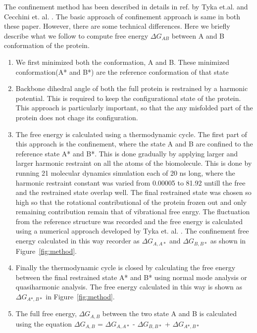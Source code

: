 \documentclass[12pt]{article}
\begin{document}
The confinement method has been described in details in ref. by Tyka et.al. \cite{Tyka2006} and 
Cecchini et. al. \cite{Cecchini2009}. The basic approach of confinement approach is same in both
these paper. However, there are some technical differences. Here we briefly describe what we follow
to compute free energy $\Delta G_{AB}$ between A and B
conformation of the protein.

\begin{enumerate}

\item  We first minimized both the conformation, A and B. These minimized conformation(A* and B*) 
       are the reference conformation of that state

\item Backbone dihedral angle of both the full protein is restrained by a harmonic potential. This is required to keep
    the configurational state of the protein. This approach is particularly important, so that the any misfolded part 
    of the protein does not chage its configuration. 

\item  The free energy is calculated using a thermodynamic cycle. The first part of this approach is the confinement, where
       the state A and B are confined to the reference state A* and B*. This is done gradually by applying larger and larger
       harmonic restraint on all the atoms of the biomolecule. This is done by running 21 molecular dynamics simulation 
       each of 20 ns long, where the harmonic restraint constant was varied from 0.00005 to 81.92 untill the free and the 
       restrained state overlap well. The final restrained state was chosen so high so that the rotational contributional 
       of the protein frozen out and only remaining contribution remain that of vibrational free enrgy. The fluctuation from
       the reference structure was recorded and the free energy is calculated using a numerical
       approach developed by Tyka et. al. \cite{Tyka2006}. The confinement free energy calculated in this way recorder as 
       $\Delta G_{A,A*}$ and $\Delta G_{B,B*}$ as shown in Figure~\ref{fig:method}.     

\item  Finally the thermodynamic cycle is closed by calculating the free energy between the final
       restrained state A* and B* using normal mode analysis or quasiharmonic analysis. The free energy calculated in 
       this way is shown as $\Delta G_{A*,B*}$ in Figure~\ref{fig:method}.

\item  The full free energy, $\Delta G_{A,B}$ between the two state A and B is calculated using the equation 
       $\Delta G_{A,B}$ = $\Delta G_{A,A*}$ - $\Delta G_{B,B*}$ + $\Delta G_{A*,B*}$  

\end{enumerate}
\end{document}
